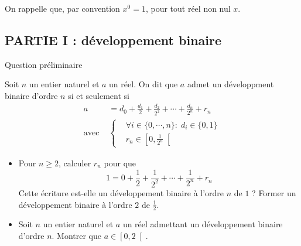 On rappelle que, par convention $x^0 =1$, pour tout réel non nul $x$.
\subsection*{PARTIE I : d{\'e}veloppement binaire}
Question pr{\'e}liminaire

Soit $n$ un entier naturel et $a$ un réel. On dit que $a$ admet un développment binaire d'ordre $n$ si et seulement si
\begin{align*}
 a &= d_0 + \frac{d_1}{2} + \frac{d_2}{2^2} + \cdots + \frac{d_n}{2^n} + r_n\\
 \text{avec }&
\left\lbrace 
\begin{aligned}
 &\forall i\in\{0,\cdots ,n\} :\; d_i\in\{0,1\}\\
 &r_n \in \left[ 0, \frac{1}{2^n}\right[ 
\end{aligned}
\right. 
\end{align*}
\begin{itemize}
 \item Pour $n\geq 2$, calculer $r_n$ pour que 
\begin{displaymath}
 1 = 0 + \frac{1}{2} + \frac{1}{2^2} + \cdots  + \frac{1}{2^n} + r_n 
\end{displaymath}
Cette écriture est-elle un développement binaire à l'ordre $n$ de $1$ ? Former un développement binaire à l'ordre $2$ de $\frac{1}{2}$.
\item Soit $n$ un entier naturel et $a$ un réel admettant un développement binaire d'ordre $n$. Montrer que $a\in \left[ 0, 2\right[$.
\end{itemize}

